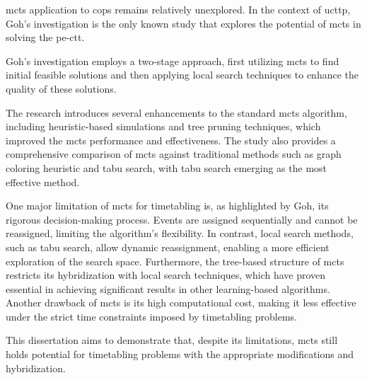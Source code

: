 \ac{mcts} application to \acp{cop} remains relatively unexplored. In the context of \ac{ucttp}, Goh's investigation \cite{goh_MCTS} is the only known study that explores the potential of \ac{mcts} in solving the \ac{pe-ctt}. 

Goh's investigation employs a two-stage approach, first utilizing \ac{mcts} to find initial feasible solutions and then applying local search techniques to enhance the quality of these solutions.

The research introduces several enhancements to the standard \ac{mcts} algorithm, including heuristic-based simulations and tree pruning techniques, which improved the \ac{mcts} performance and effectiveness. The study also provides a comprehensive comparison of \ac{mcts} against traditional methods such as graph coloring heuristic and tabu search, with tabu search emerging as the most effective method.

One major limitation of \ac{mcts} for timetabling is, as highlighted by Goh, its rigorous decision-making process. Events are assigned sequentially and cannot be reassigned, limiting the algorithm's flexibility. In contrast, local search methods, such as tabu search, allow dynamic reassignment, enabling a more efficient exploration of the search space. Furthermore, the tree-based structure of \ac{mcts} restricts its hybridization with local search techniques, which have proven essential in achieving significant results in other learning-based algorithms. Another drawback of \ac{mcts} is its high computational cost, making it less effective under the strict time constraints imposed by timetabling problems.

This dissertation aims to demonstrate that, despite its limitations, \ac{mcts} still holds potential for timetabling problems with the appropriate modifications and hybridization. 





















